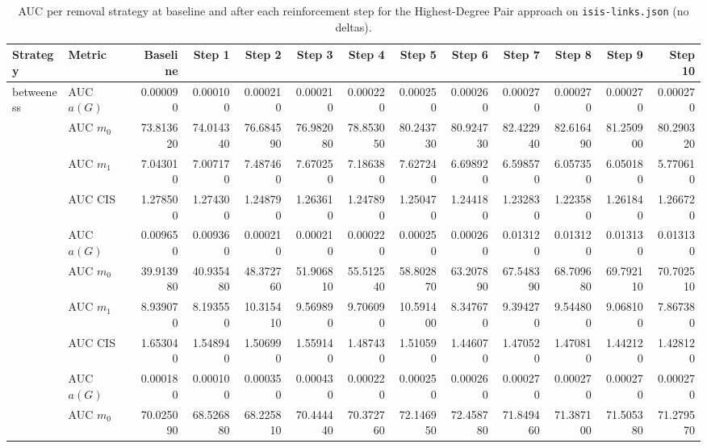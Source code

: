\begin{table}[htbp]
  \centering
  \caption{AUC per removal strategy at baseline and after each reinforcement step for the Highest-Degree Pair approach on \texttt{isis-links.json} (no deltas).}
  \label{tab:isis-links-highest_degree_pair-auc}
\setlength{\tabcolsep}{2.5pt}
  \begin{tabular}{llrrrrrrrrrrr}
    \toprule
    \textbf{Strategy} & \textbf{Metric} & \textbf{Baseline} & \textbf{Step 1} & \textbf{Step 2} & \textbf{Step 3} & \textbf{Step 4} & \textbf{Step 5} & \textbf{Step 6} & \textbf{Step 7} & \textbf{Step 8} & \textbf{Step 9} & \textbf{Step 10} \\
    \midrule
    \multirow{4}{*}{betweeness} & AUC $a(G)$ & 0.000090 & 0.000100 & 0.000210 & 0.000210 & 0.000220 & 0.000250 & 0.000260 & 0.000270 & 0.000270 & 0.000270 & 0.000270 \\
    & AUC $m_0$ & 73.813620 & 74.014340 & 76.684590 & 76.982080 & 78.853050 & 80.243730 & 80.924730 & 82.422940 & 82.616490 & 81.250900 & 80.290320 \\
    & AUC $m_1$ & 7.043010 & 7.007170 & 7.487460 & 7.670250 & 7.186380 & 7.627240 & 6.698920 & 6.598570 & 6.057350 & 6.050180 & 5.770610 \\
    & AUC CIS & 1.278500 & 1.274300 & 1.248790 & 1.263610 & 1.247890 & 1.250470 & 1.244180 & 1.232830 & 1.223580 & 1.261840 & 1.266720 \\
    \addlinespace
    \multirow{4}{*}{closeness} & AUC $a(G)$ & 0.009650 & 0.009360 & 0.000210 & 0.000210 & 0.000220 & 0.000250 & 0.000260 & 0.013120 & 0.013120 & 0.013130 & 0.013130 \\
    & AUC $m_0$ & 39.913980 & 40.935480 & 48.372760 & 51.906810 & 55.512540 & 58.802870 & 63.207890 & 67.548390 & 68.709680 & 69.792110 & 70.702510 \\
    & AUC $m_1$ & 8.939070 & 8.193550 & 10.315410 & 9.569890 & 9.706090 & 10.591400 & 8.347670 & 9.394270 & 9.544800 & 9.068100 & 7.867380 \\
    & AUC CIS & 1.653040 & 1.548940 & 1.506990 & 1.559140 & 1.487430 & 1.510590 & 1.446070 & 1.470520 & 1.470810 & 1.442120 & 1.428120 \\
    \addlinespace
    \multirow{4}{*}{core influence} & AUC $a(G)$ & 0.000180 & 0.000100 & 0.000350 & 0.000430 & 0.000220 & 0.000250 & 0.000260 & 0.000270 & 0.000270 & 0.000270 & 0.000270 \\
    & AUC $m_0$ & 70.025090 & 68.526880 & 68.225810 & 70.444440 & 70.372760 & 72.146950 & 72.458780 & 71.849460 & 71.387100 & 71.505380 & 71.279570 \\

\end{tabular}
\end{table}
